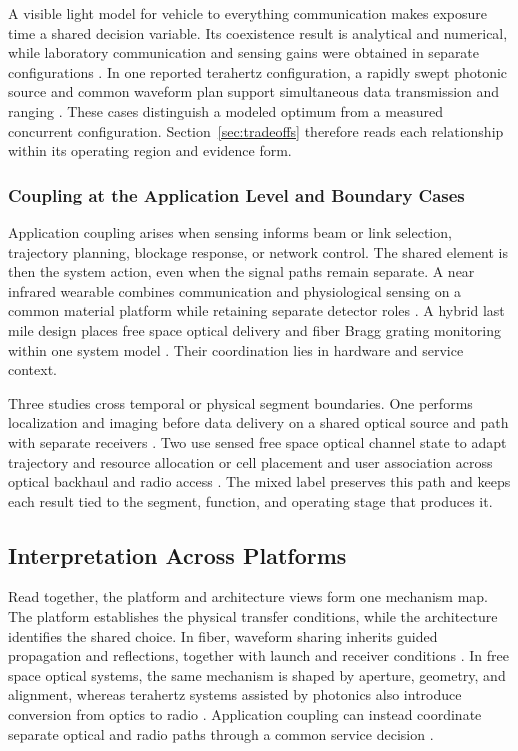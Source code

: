 A visible light model for vehicle to everything communication makes exposure
time a shared decision variable.
Its coexistence result is analytical and numerical, while laboratory
communication and sensing gains were obtained in separate configurations
\cite{OISAC_SCR00273}. In one reported terahertz configuration, a rapidly swept
photonic source and common waveform plan support simultaneous data transmission
and ranging \cite{OISAC_SCR00083}. These cases distinguish a modeled optimum
from a measured concurrent configuration. Section~\ref{sec:tradeoffs} therefore
reads each relationship within its operating region and evidence form.

\subsubsection{Coupling at the Application Level and Boundary Cases}

Application coupling arises when sensing informs beam or link selection,
trajectory planning, blockage response, or network control. The shared element
is then the system action, even when the signal paths remain separate. A near
infrared wearable combines communication and physiological sensing on a common
material platform while retaining separate detector roles
\cite{OISAC_SCR00001}. A hybrid last mile design places free space optical
delivery and fiber Bragg grating monitoring within one system model
\cite{OISAC_SCR00277}. Their coordination lies in hardware and service context.

Three studies cross temporal or physical segment boundaries. One performs
localization and imaging before data delivery on a shared optical source and
path with separate receivers \cite{OISAC_SCR00012}. Two use sensed free space
optical channel state to adapt trajectory and resource allocation or cell
placement and user association across optical backhaul and radio access
\cite{OISAC_SCR00917,OISAC_SCR00922}. The mixed label preserves this path and
keeps each result tied to the segment, function, and operating stage that
produces it.

\subsection{Interpretation Across Platforms}

Read together, the platform and architecture views form one mechanism map. The
platform establishes the physical transfer conditions, while the architecture
identifies the shared choice. In fiber, waveform sharing inherits guided
propagation and reflections, together with launch and receiver conditions
\cite{OISAC_SCR00038,OISAC_SCR00647}. In free space optical systems, the same
mechanism is shaped by aperture, geometry, and alignment, whereas terahertz
systems assisted by photonics also introduce conversion from optics to radio
\cite{OISAC_SCR00011,OISAC_SCR00036}. Application coupling can instead
coordinate separate optical and radio paths through a common service decision
\cite{OISAC_SCR00917}.

